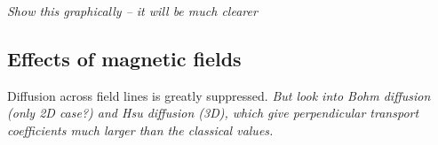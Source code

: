 \documentclass{emulateapj}
\begin{document}
\textit{Show this graphically -- it will be much clearer}

\subsection{Effects of magnetic fields}
\label{sec:effects-magn-fields}

Diffusion across field lines is greatly suppressed.  \emph{But look
  into Bohm diffusion (only 2D case?) and Hsu diffusion (3D), which
  give perpendicular transport coefficients much larger than the
  classical values.}

\clearpage


\end{document}
